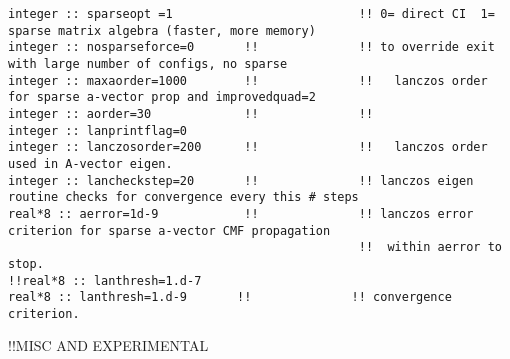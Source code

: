 \begin{verbatim}
integer :: sparseopt =1                          !! 0= direct CI  1= sparse matrix algebra (faster, more memory)
integer :: nosparseforce=0       !!              !! to override exit with large number of configs, no sparse
integer :: maxaorder=1000        !!              !!   lanczos order for sparse a-vector prop and improvedquad=2
integer :: aorder=30             !!              !!   
integer :: lanprintflag=0
integer :: lanczosorder=200      !!              !!   lanczos order used in A-vector eigen.
integer :: lancheckstep=20       !!              !! lanczos eigen routine checks for convergence every this # steps
real*8 :: aerror=1d-9            !!              !! lanczos error criterion for sparse a-vector CMF propagation
                                                 !!  within aerror to stop.
!!real*8 :: lanthresh=1.d-7
real*8 :: lanthresh=1.d-9       !!              !! convergence criterion.
\end{verbatim}
!!{\large \quad MISC AND EXPERIMENTAL}
